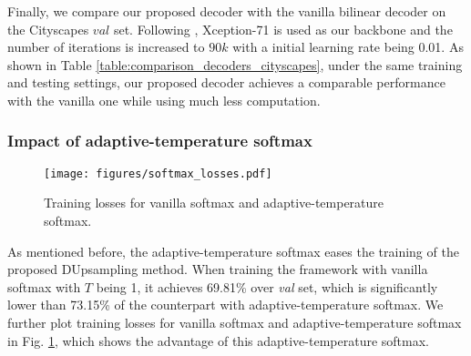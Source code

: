 \documentclass[10pt,twocolumn,letterpaper]{article}
\newcommand{\1}{{\mathbbm{1}}}
\begin{document}
Finally, we compare our proposed decoder with the vanilla bilinear decoder on the Cityscapes $val$ set. Following \cite{chen2018encoder}, Xception-71 is used as our backbone and the number of iterations is increased to $90k$ with a initial learning rate being 0.01. As shown in Table \ref{table:comparison_decoders_cityscapes}, under the same training and testing settings, our proposed decoder achieves a comparable performance with the vanilla one while using much less  computation.
\subsubsection{Impact of adaptive-temperature softmax} \label{section:temperature_softmax}
\begin{figure}[ht!]
  \centering
  \texttt{[image: figures/softmax\_losses.pdf]}
  \caption{Training losses for vanilla softmax and adaptive-temperature softmax.}
  \label{fig:softmax_losses}
\end{figure}




As mentioned before, the adaptive-temperature softmax eases the training of the proposed DUpsampling method. When training the framework with vanilla softmax with $T$ being 1, it achieves 69.81\% over {\it val} set, which is significantly lower than 73.15\% of the counterpart with adaptive-temperature softmax. We further plot training losses for vanilla softmax and adaptive-temperature softmax in Fig. \ref{fig:softmax_losses}, which shows the advantage of this adaptive-temperature softmax.
\end{document}
